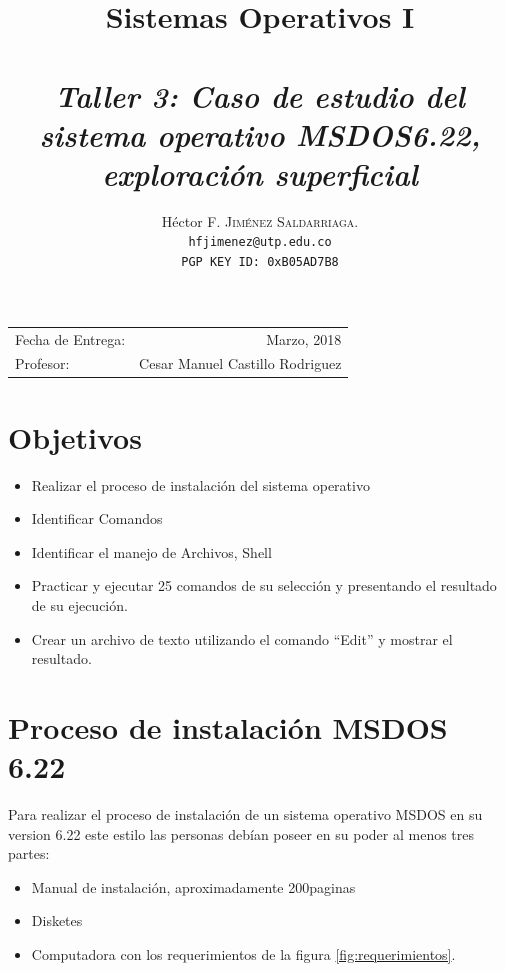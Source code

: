 \documentclass[paper=a4, fontsize=12pt]{article} 		%
\title{Sistemas Operativos I\\ 
\horrule{0.5pt} \\[0.4cm] 								%
\textit{Taller 3: Caso de estudio del sistema operativo MSDOS6.22, exploración superficial}
\horrule{1pt} \\[0.5cm] 			
}
\author{												
Héctor F. \textsc{Jiménez Saldarriaga.}\\				%
\texttt{hfjimenez@utp.edu.co} \\						
\texttt{PGP KEY ID: 0xB05AD7B8}
}
\date{}    						                       %
\numberwithin{equation}{section}						%
\numberwithin{table}{section} 							%
\begin{document}
\maketitle                      			           %
\begin{center}
\begin{tabular}{l r}								   %
Fecha de Entrega: & Marzo, 2018 \\				   %
Profesor: & Cesar Manuel Castillo Rodriguez
\end{tabular}
\end{center}
\section{Objetivos}
\begin{itemize}
	\item Realizar el proceso de instalación del sistema operativo
	\item Identificar Comandos 
    \item Identificar el manejo de Archivos, Shell
    \item Practicar y ejecutar 25 comandos de su selección y presentando el resultado de su ejecución.
	\item Crear un archivo de texto utilizando el comando “Edit” y mostrar el resultado.
\end{itemize}
\section{Proceso de instalación MSDOS 6.22 }
Para realizar el proceso de instalación de un sistema operativo MSDOS en su version 6.22 este estilo las personas debían poseer en su poder al menos tres partes:
\begin{itemize}
\item Manual de instalación, aproximadamente 200paginas
\item Disketes
\item Computadora con los requerimientos de la figura \ref{fig:requerimientos}.
\end{itemize}
\end{document}
